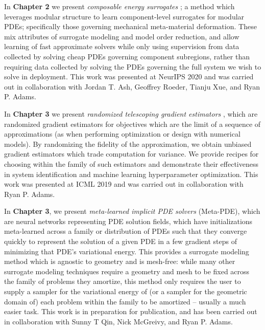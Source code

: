 \documentclass{puthesis}
\begin{document}
In \textbf{Chapter 2} we present \emph{composable energy surrogates} \citep{beatson2020learning};
a method which leverages
modular structure to learn component-level surrogates for modular PDEs; specifically
those governing mechanical meta-material deformation.
These mix attributes of surrogate modeling and model order reduction, and allow
learning of fast approximate solvers while only using supervision from data collected
by solving cheap PDEs governing component subregions, rather than requiring data
collected by solving the PDEs governing the full system we wish to solve in deployment.
This work was presented at NeurIPS 2020 and was carried out in collaboration with
Jordan T. Ash, Geoffrey Roeder, Tianju Xue, and Ryan P. Adams.

In \textbf{Chapter 3} we present \emph{randomized telescoping gradient estimators} \citep{beatson2019efficient}, which are
randomized gradient estimators for objectives which are the limit of a sequence of
approximations (as when performing optimization or design with numerical models).
By randomizing the fidelity of the approximation, we obtain unbiased gradient estimators
which trade computation for variance.
We provide recipes for choosing within the family of such estimators and demonstrate
their effectiveness in system identification and machine learning hyperparameter
optimization.
This work was presented at ICML 2019
and was carried out in collaboration with Ryan P. Adams.

In \textbf{Chapter 3},
we present \emph{meta-learned implicit PDE solvers} (Meta-PDE), which are neural networks
representing PDE solution fields, which have initializations meta-learned across a
family or distribution of PDEs such that they converge quickly to represent the solution
of a given PDE in a few gradient steps of minimizing that PDE's variational energy.
This provides a surrogate modeling method which is agnostic to geometry and is mesh-free:
while many other surrogate modeling techniques require a geometry and mesh to be fixed
across the family of problems they amortize, this method only requires the user to
supply a sampler for the variational energy of (or a sampler for the geometric domain of)
each problem within the family to be amortized -- usually a much easier task.
This work is in preparation for publication, and has been
carried out in collaboration with Sunny T Qin, Nick McGreivy, and Ryan P. Adams.
\end{document}
